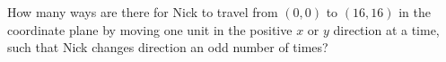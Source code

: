 How many ways are there for Nick to travel from $(0,0)$ to $(16,16)$ in the coordinate plane by moving one unit in the positive $x$ or $y$ direction at a time, such that Nick changes direction an odd number of times?
